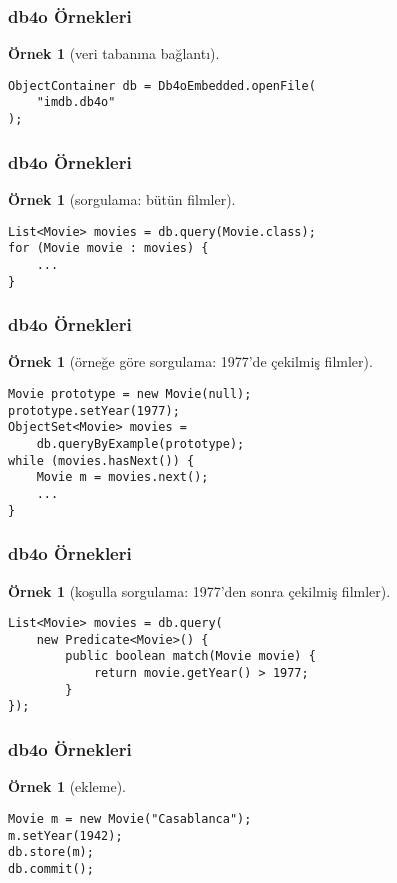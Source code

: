 \documentclass[dvipsnames]{beamer}
\theoremstyle{definition}
\theoremstyle{example}
\newtheorem{ornek}[theorem]{Örnek}
\theoremstyle{plain}
\begin{document}
\begin{frame}[fragile]
  \frametitle{db4o Örnekleri}

  \begin{ornek}[veri tabanına bağlantı]
    \begin{lstlisting}
ObjectContainer db = Db4oEmbedded.openFile(
    "imdb.db4o"
);
    \end{lstlisting}
  \end{ornek}
\end{frame}

\begin{frame}[fragile]
  \frametitle{db4o Örnekleri}

  \begin{ornek}[sorgulama: bütün filmler]
    \begin{lstlisting}
List<Movie> movies = db.query(Movie.class);
for (Movie movie : movies) {
    ...
}
    \end{lstlisting}
  \end{ornek}
\end{frame}

\begin{frame}[fragile]
  \frametitle{db4o Örnekleri}

  \begin{ornek}[örneğe göre sorgulama: 1977'de çekilmiş filmler]
    \begin{lstlisting}
Movie prototype = new Movie(null);
prototype.setYear(1977);
ObjectSet<Movie> movies =
    db.queryByExample(prototype);
while (movies.hasNext()) {
    Movie m = movies.next();
    ...
}
    \end{lstlisting}
  \end{ornek}
\end{frame}

\begin{frame}[fragile]
  \frametitle{db4o Örnekleri}

  \begin{ornek}[koşulla sorgulama: 1977'den sonra çekilmiş filmler]
    \begin{lstlisting}
List<Movie> movies = db.query(
    new Predicate<Movie>() {
        public boolean match(Movie movie) {
            return movie.getYear() > 1977;
        }
});
    \end{lstlisting}
  \end{ornek}
\end{frame}

\begin{frame}[fragile]
  \frametitle{db4o Örnekleri}

  \begin{ornek}[ekleme]
    \begin{lstlisting}
Movie m = new Movie("Casablanca");
m.setYear(1942);
db.store(m);
db.commit();
    \end{lstlisting}
  \end{ornek}
\end{frame}
\end{document}
